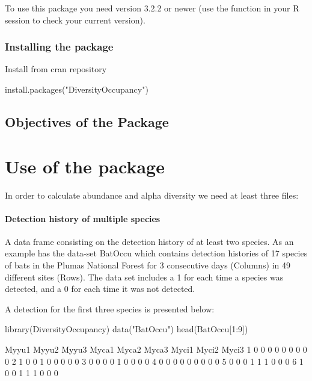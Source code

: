 \documentclass[article]{jss}
\begin{document}
To use this package you need  version 3.2.2 or newer (use
the function  in your R session to check your
current version).

\subsubsection{Installing the package}\label{installing-the-package}

Install from cran repository

\begin{CodeChunk}
\begin{CodeInput}
install.packages("DiversityOccupancy")
\end{CodeInput}
\end{CodeChunk}

\subsection{Objectives of the Package}\label{objectives-of-the-package}

\section{Use of the package}\label{use-of-the-package}

In order to calculate abundance and alpha diversity we need at least
three files:

\paragraph{Detection history of multiple
species}\label{detection-history-of-multiple-species}

A data frame consisting on the detection history of at least two
species. As an example  has the data-set BatOccu
which contains detection histories of 17 species of bats in the Plumas
National Forest for 3 consecutive days (Columns) in 49 different sites
(Rows). The data set includes a 1 for each time a species was detected,
and a 0 for each time it was not detected.

A detection for the first three species is presented below:

\begin{CodeChunk}
\begin{CodeInput}
library(DiversityOccupancy)
data("BatOccu")
head(BatOccu[1:9])
\end{CodeInput}
\begin{CodeOutput}
  Myyu1 Myyu2 Myyu3 Myca1 Myca2 Myca3 Myci1 Myci2 Myci3
1     0     0     0     0     0     0     0     0     0
2     1     0     0     1     0     0     0     0     0
3     0     0     0     0     1     0     0     0     0
4     0     0     0     0     0     0     0     0     0
5     0     0     0     1     1     1     0     0     0
6     1     0     0     1     1     1     0     0     0
\end{CodeOutput}
\end{CodeChunk}
\end{document}
